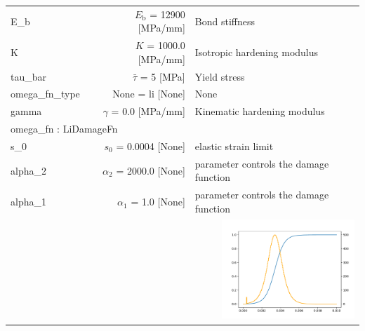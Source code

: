 \documentclass{article}
\newcounter{bmcsexample}
\begin{document}
\begin{bmcsexample}
\begin{center}
\begin{tabular}{lrp{4cm}}
E\_b & $E_\mathrm{b}$ = 12900 [MPa/mm] & {\footnotesize Bond stiffness}  \\
            K & $K$ = 1000.0 [MPa/mm] & {\footnotesize Isotropic hardening modulus}  \\
            tau\_bar & $\bar{\tau}$ = 5 [MPa] & {\footnotesize Yield stress}  \\
            omega\_fn\_type & None = li [None] & {\footnotesize None}  \\
            gamma & $\gamma$ = 0.0 [MPa/mm] & {\footnotesize Kinematic hardening modulus}  \\
            \hline
\multicolumn{3}{l}{omega\_fn : LiDamageFn}\\ \hline

s\_0 & $s_0$ = 0.0004 [None] & {\footnotesize elastic strain limit}  \\
            alpha\_2 & $\alpha_2$ = 2000.0 [None] & {\footnotesize parameter controls the damage function}  \\
            alpha\_1 & $\alpha_1$ = 1.0 [None] & {\footnotesize parameter controls the damage function}  \\
            
\multicolumn{3}{r}{\includegraphics[width=5cm]{fig140675832007280.pdf}}\\
\hline \end{tabular}


\end{center}


\end{bmcsexample}
\end{document}
